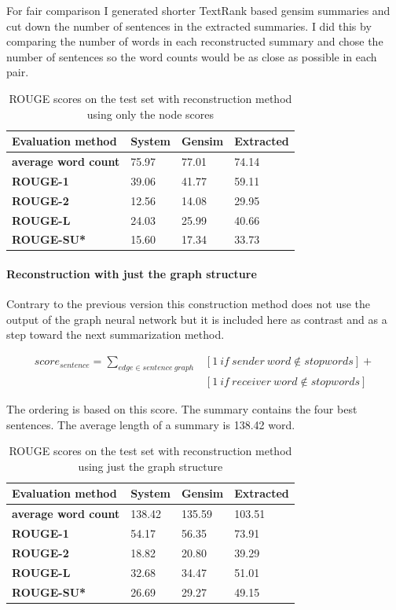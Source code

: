 For fair comparison I generated shorter TextRank based gensim summaries and cut down the number of sentences in the extracted summaries. I did this by comparing the number of words in each reconstructed summary and chose the number of sentences so the word counts would be as close as possible in each pair.

\begin{table}[!ht]
	\centering
	\begin{tabular}{| l | l | l | l |}
		\hline
		\textbf{Evaluation method}&\textbf{System}&\textbf{Gensim}&\textbf{Extracted}\\ \hline \hline
		\textbf{average word count}&75.97&77.01&74.14 \\ \hline
		\textbf{ROUGE-1}&39.06&41.77&59.11 \\ \hline
		\textbf{ROUGE-2}&12.56&14.08&29.95 \\ \hline
		\textbf{ROUGE-L}&24.03&25.99&40.66 \\ \hline
		\textbf{ROUGE-SU*}&15.60&17.34&33.73 \\ \hline
	\end{tabular}
	\caption{ROUGE scores on the test set with reconstruction method using only the node scores}
\end{table}
\FloatBarrier

\paragraph{Reconstruction with just the graph structure}

Contrary to the previous version this construction method does not use the output of the graph neural network but it is included here as contrast and as a step toward the next summarization method.

\begin{eqnarray*}
	score_{sentence} = \sum_{edge \in sentence\ graph} &[1\ if\ sender\ word \notin stopwords] + \\&[1\ if\ receiver\ word \notin stopwords]
\end{eqnarray*}

The ordering is based on this score. The summary contains the four best sentences. The average length of a summary is 138.42 word.

\begin{table}[!ht]
	\centering
	\begin{tabular}{| l | l | l | l |}
		\hline
		\textbf{Evaluation method}&\textbf{System}&\textbf{Gensim}&\textbf{Extracted}\\ \hline \hline
		
		\textbf{average word count}&138.42&135.59&103.51 \\ \hline
		\textbf{ROUGE-1}&54.17&56.35&73.91 \\ \hline
		\textbf{ROUGE-2}&18.82&20.80&39.29 \\ \hline
		\textbf{ROUGE-L}&32.68&34.47&51.01 \\ \hline
		\textbf{ROUGE-SU*}&26.69&29.27&49.15 \\ \hline
	\end{tabular}
	\caption{ROUGE scores on the test set with reconstruction method using just the graph structure}
\end{table}
\FloatBarrier

